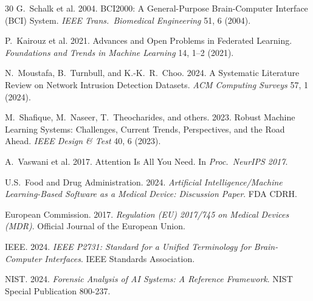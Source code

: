 \documentclass[sigconf,nonacm]{acmart}
\begin{document}
\begin{thebibliography}{30}
G.~Schalk et al. 2004. BCI2000: A General-Purpose
Brain-Computer Interface (BCI) System.
\textit{IEEE Trans.\ Biomedical Engineering} 51, 6 (2004).

P.~Kairouz et al. 2021. Advances and Open Problems in Federated
Learning. \textit{Foundations and Trends in Machine Learning} 14,
1--2 (2021).

N.~Moustafa, B.~Turnbull, and K.-K.~R.~Choo. 2024. A Systematic
Literature Review on Network Intrusion Detection Datasets.
\textit{ACM Computing Surveys} 57, 1 (2024).

M.~Shafique, M.~Naseer, T.~Theocharides, and others. 2023. Robust
Machine Learning Systems: Challenges, Current Trends, Perspectives,
and the Road Ahead. \textit{IEEE Design \& Test} 40, 6 (2023).

A.~Vaswani et al. 2017. Attention Is All You Need. In
\textit{Proc.\ NeurIPS 2017}.

U.S.~Food and Drug Administration. 2024. \textit{Artificial
Intelligence/Machine Learning-Based Software as a Medical Device:
Discussion Paper}. FDA CDRH.

European Commission. 2017. \textit{Regulation (EU) 2017/745 on
Medical Devices (MDR)}. Official Journal of the European Union.

IEEE. 2024. \textit{IEEE P2731: Standard for a Unified Terminology
for Brain-Computer Interfaces}. IEEE Standards Association.

NIST. 2024. \textit{Forensic Analysis of AI Systems: A Reference
Framework}. NIST Special Publication 800-237.

\end{thebibliography}
\end{document}
